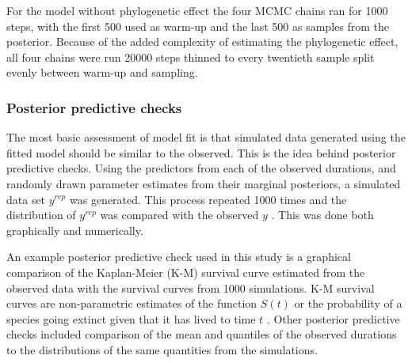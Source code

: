 \documentclass[12pt,letterpaper]{article}
\begin{document}
For the model without phylogenetic effect the four MCMC chains ran for 1000 steps, with the first 500 used as warm-up and the last 500 as samples from the posterior. Because of the added complexity of estimating the phylogenetic effect, all four chains were run 20000 steps thinned to every twentieth sample split evenly between warm-up and sampling. 



\subsubsection{Posterior predictive checks}

The most basic assessment of model fit is that simulated data generated using the fitted model should be similar to the observed. This is the idea behind posterior predictive checks. Using the predictors from each of the observed durations, and randomly drawn parameter estimates from their marginal posteriors, a simulated data set \(y^{rep}\) was generated. This process repeated 1000 times and the distribution of \(y^{rep}\) was compared with the observed \(y\) \citep{Gelman2013d}. This was done both graphically and numerically.

An example posterior predictive check used in this study is a graphical comparison of the Kaplan-Meier (K-M) survival curve estimated from the observed data with the survival curves from 1000 simulations. K-M survival curves are non-parametric estimates of the function \(S(t)\) or the probability of a species going extinct given that it has lived to time \(t\) \citep{Klein2003}. Other posterior predictive checks included comparison of the mean and quantiles of the observed durations to the distributions of the same quantities from the simulations.
\end{document}
